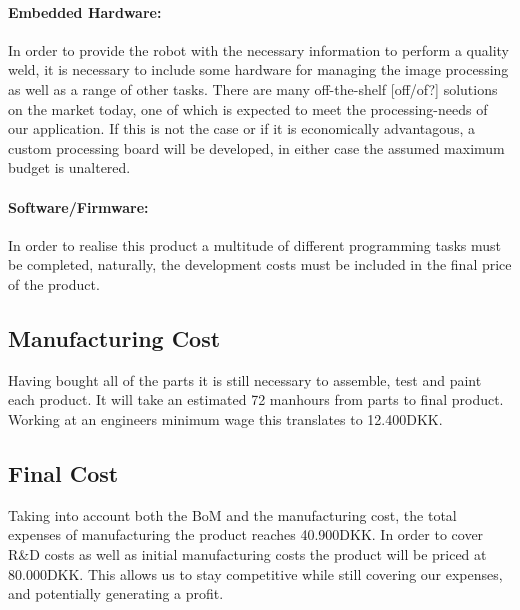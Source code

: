 \paragraph{Embedded Hardware:}
In order to provide the robot with the necessary information to perform a quality weld, it is necessary to include some hardware for managing the image processing as well as a range of other tasks. There are many off-the-shelf [off/of?] solutions on the market today, one of which is expected to meet the processing-needs of our application. If this is not the case or if it is economically advantagous, a custom processing board will be developed, in either case the assumed maximum budget is unaltered.
\paragraph{Software/Firmware:}
In order to realise this product a multitude of different programming tasks must be completed, naturally, the development costs must be included in the final price of the product.
\subsection{Manufacturing Cost}
Having bought all of the parts it is still necessary to assemble, test and paint each product. It will take an estimated 72 manhours from parts to final product. Working at an engineers minimum wage this translates to 12.400DKK.
\subsection{Final Cost}
Taking into account both the BoM and the manufacturing cost, the total expenses of manufacturing the product reaches 40.900DKK. In order to cover R\&D costs as well as initial manufacturing costs the product will be priced at 80.000DKK. This allows us to stay competitive while still covering our expenses, and potentially generating a profit.